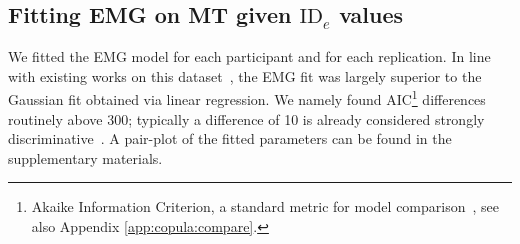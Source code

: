\documentclass[acmlarge, manuscript,review]{acmart}
\newcommand{\ide}{\ensuremath{{\text{ID}_e}}\xspace}
\begin{document}

\subsection{Fitting EMG on MT given \ide values \label{subs:jgp:emg}}
We fitted the EMG model for each participant and for each replication. In line with existing works on this dataset~\cite{gori2018these,zhao2022}, the EMG fit was largely superior to the Gaussian fit obtained via linear regression. We namely found AIC\footnote{Akaike Information Criterion, a standard metric for model comparison~\cite{anderson2004}, see also Appendix \ref{app:copula:compare}.} differences routinely above 300; typically a difference of 10 is already considered strongly discriminative~\cite{anderson2004}. A pair-plot of the fitted parameters can be found in the supplementary materials.

\end{document}
